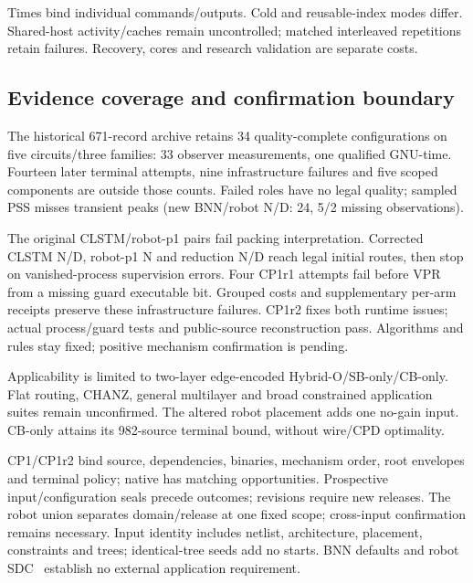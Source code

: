 \documentclass[conference,10pt]{IEEEtran}
\begin{document}
Times bind individual commands/outputs. Cold and reusable-index modes differ. Shared-host activity/caches remain uncontrolled; matched interleaved repetitions retain failures. Recovery, cores and research validation are separate costs.

\subsection{Evidence coverage and confirmation boundary}
The historical 671-record archive retains 34 quality-complete configurations on five circuits/three families: 33 observer measurements, one qualified GNU-time. Fourteen later terminal attempts, nine infrastructure failures and five scoped components are outside those counts. Failed roles have no legal quality; sampled PSS misses transient peaks (new BNN/robot N/D: 24, 5/2 missing observations).

The original CLSTM/robot-p1 pairs fail packing interpretation. Corrected CLSTM N/D, robot-p1 N and reduction N/D reach legal initial routes, then stop on vanished-process supervision errors. Four CP1r1 attempts fail before VPR from a missing guard executable bit. Grouped costs and supplementary per-arm receipts preserve these infrastructure failures. CP1r2 fixes both runtime issues; actual process/guard tests and public-source reconstruction pass. Algorithms and rules stay fixed; positive mechanism confirmation is pending.

Applicability is limited to two-layer edge-encoded Hybrid-O/SB-only/CB-only. Flat routing, CHANZ, general multilayer and broad constrained application suites remain unconfirmed. The altered robot placement adds one no-gain input. CB-only attains its 982-source terminal bound, without wire/CPD optimality.

CP1/CP1r2 bind source, dependencies, binaries, mechanism order, root envelopes and terminal policy; native has matching opportunities. Prospective input/configuration seals precede outcomes; revisions require new releases. The robot union separates domain/release at one fixed scope; cross-input confirmation remains necessary. Input identity includes netlist, architecture, placement, constraints and trees; identical-tree seeds add no starts. BNN defaults and robot SDC~\cite{vprsdc} establish no external application requirement.
\end{document}
